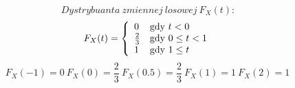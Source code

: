 \begin{zad}
$$
Dystrybuanta\ zmiennej\ losowej\ F_X(t):
$$
$$
F_X(t)
 = \left\{ \begin{array}{ll}
0 & \textrm{gdy $t < 0$}\\
\frac{2}{3} & \textrm{gdy $ 0 \leq t < 1 $}\\
1 & \textrm{gdy $1 \leq t$}
\end{array} \right.
$$
$$
F_X(-1) = 0\
F_X(0) = \frac{2}{3}\
F_X(0.5) = \frac{2}{3}\
F_X(1) = 1\
F_X(2) = 1\
$$
\end{zad}
